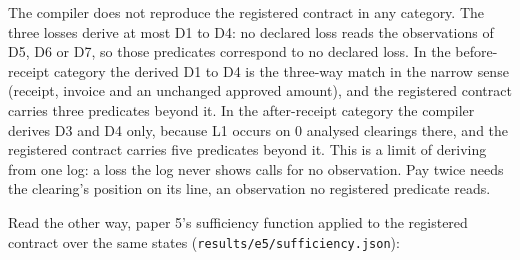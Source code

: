 \documentclass[
  10pt,
]{article}
\begin{document}
The compiler does not reproduce the registered contract in any category.
The three losses derive at most D1 to D4: no declared loss reads the
observations of D5, D6 or D7, so those predicates correspond to no
declared loss. In the before-receipt category the derived D1 to D4 is
the three-way match in the narrow sense (receipt, invoice and an
unchanged approved amount), and the registered contract carries three
predicates beyond it. In the after-receipt category the compiler derives
D3 and D4 only, because L1 occurs on 0 analysed clearings there, and the
registered contract carries five predicates beyond it. This is a limit
of deriving from one log: a loss the log never shows calls for no
observation. Pay twice needs the clearing's position on its line, an
observation no registered predicate reads.

Read the other way, paper 5's sufficiency function applied to the
registered contract over the same states
(\texttt{results/e5/sufficiency.json}):
\end{document}
